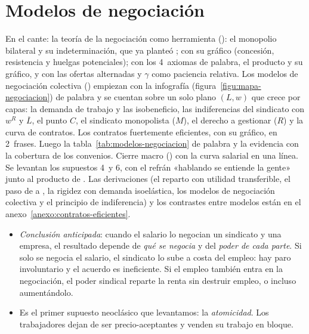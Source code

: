 \documentclass[11pt]{article}
\begin{document}
\section{Modelos de negociación}\label{sec:negociacion}

\begin{notaopositor}
En el cante: la teoría de la negociación como herramienta (): el monopolio bilateral y su indeterminación, que ya planteó ;  con su gráfico (concesión, resistencia y huelgas potenciales);  con los 4~axiomas de palabra, el producto y su gráfico, y  con las ofertas alternadas y $\gamma$ como paciencia relativa. Los modelos de negociación colectiva () empiezan con la infografía (figura~\ref{figu:mapa-negociacion}) de palabra y se cuentan sobre un solo plano $(L,w)$ que crece por capas: la demanda de trabajo y las isobeneficio, las indiferencias del sindicato con $w^R$ y $\overline{L}$, el punto $C$, el sindicato monopolista ($M$), el derecho a gestionar ($R$) y la curva de contratos. Los contratos fuertemente eficientes, con su gráfico, en 2~frases. Luego la tabla~\ref{tab:modelos-negociacion} de palabra y la evidencia con la cobertura de los convenios. Cierre macro () con la curva salarial en una línea. Se levantan los supuestos 4~y 6, con el refrán «hablando se entiende la gente» junto al producto de . Las derivaciones (el reparto con utilidad transferible, el paso de  a , la rigidez con demanda isoelástica, los modelos de negociación colectiva y el principio de indiferencia) y los contrastes entre modelos están en el anexo~\ref{anexo:contratos-eficientes}.
\end{notaopositor}

\begin{itemize}
\item \emph{Conclusión anticipada}: cuando el salario lo negocian un sindicato y una empresa, el resultado depende de \emph{qué se negocia} y del \emph{poder de cada parte}. Si solo se negocia el salario, el sindicato lo sube a costa del empleo: hay paro involuntario y el acuerdo es ineficiente. Si el empleo también entra en la negociación, el poder sindical reparte la renta sin destruir empleo, o incluso aumentándolo.
\item Es el primer supuesto neoclásico que levantamos: la \emph{atomicidad}. Los trabajadores dejan de ser precio-aceptantes y venden su trabajo en bloque.
\end{itemize}
\end{document}
